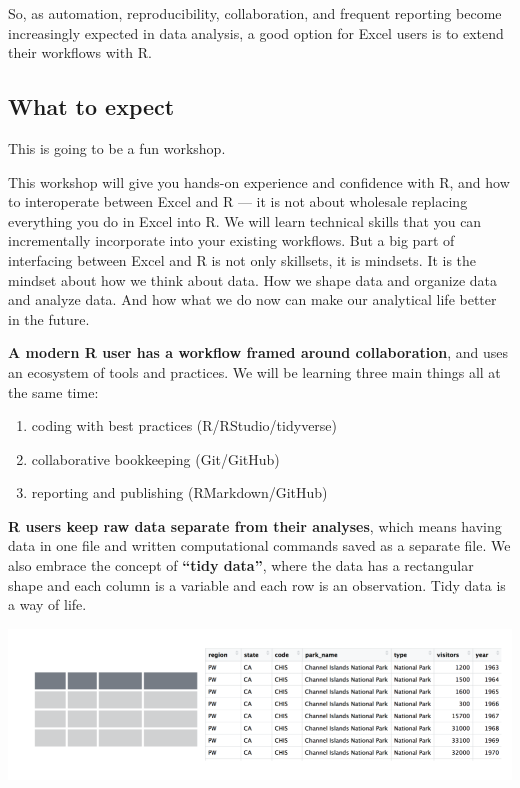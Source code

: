 \documentclass[]{book}
\providecommand{\tightlist}{%
  \setlength{\itemsep}{0pt}\setlength{\parskip}{0pt}}
\begin{document}
So, as automation, reproducibility, collaboration, and frequent reporting become increasingly expected in data analysis, a good option for Excel users is to extend their workflows with R.

\hypertarget{what-to-expect}{%
\subsection{What to expect}\label{what-to-expect}}

This is going to be a fun workshop.

This workshop will give you hands-on experience and confidence with R, and how to interoperate between Excel and R --- it is not about wholesale replacing everything you do in Excel into R.
We will learn technical skills that you can incrementally incorporate into your existing workflows. But a big part of interfacing between Excel and R is not only skillsets, it is mindsets. It is the mindset about how we think about data. How we shape data and organize data and analyze data. And how what we do now can make our analytical life better in the future.

\textbf{A modern R user has a workflow framed around collaboration}, and uses an ecosystem of tools and practices. We will be learning three main things all at the same time:

\begin{enumerate}
\def\labelenumi{\arabic{enumi}.}
\tightlist
\item
  coding with best practices (R/RStudio/tidyverse)
\item
  collaborative bookkeeping (Git/GitHub)
\item
  reporting and publishing (RMarkdown/GitHub)
\end{enumerate}

\textbf{R users keep raw data separate from their analyses}, which means having data in one file and written computational commands saved as a separate file. We also embrace the concept of \textbf{``tidy data''}, where the data has a rectangular shape and each column is a variable and each row is an observation. Tidy data is a way of life.

\includegraphics[width=0.7\linewidth]{img/tidy_img_np}
\end{document}
